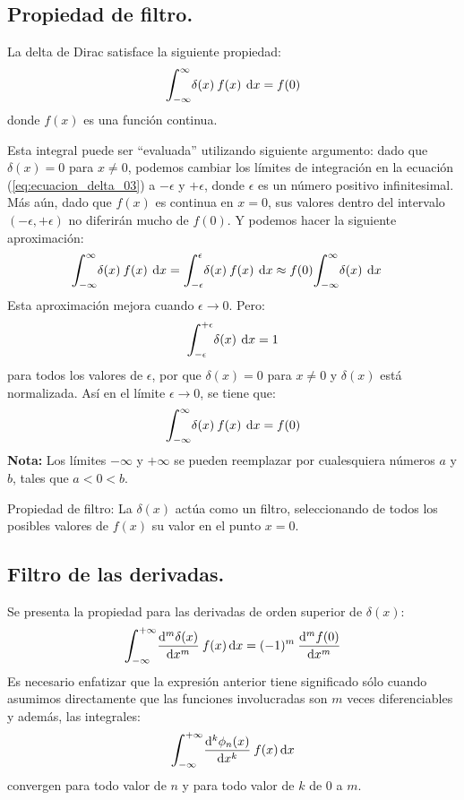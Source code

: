 \documentclass[12pt]{article}
\def\scaleint#1{\vcenter{\hbox{\scaleto[3ex]{\displaystyle\int}{#1}}}}
\def\bs{\mkern-12mu}
\numberwithin{equation}{section}
\begin{document}
\subsection{Propiedad de filtro.}

La delta de Dirac satisface la siguiente propiedad:
\begin{equation}
\scaleint{6ex}_{\bs -\infty}^{\infty} \delta (x) \: f (x) \: \dd{x} = f (0)
\label{eq:ecuacion_delta_03}
\end{equation}
donde $f(x)$ es una función continua.
\par
Esta integral puede ser \enquote{evaluada} utilizando siguiente argumento:  dado que $\delta (x) = 0$
para $x \neq 0$, podemos cambiar los límites de integración en la ecuación (\ref{eq:ecuacion_delta_03}) a $- \epsilon$ y $+ \epsilon$, donde $\epsilon$ es un número positivo infinitesimal. Más aún, dado que $f (x)$ es continua en $x = 0$, sus valores dentro del intervalo $( - \epsilon, + \epsilon)$ no diferirán mucho de $f(0)$. Y podemos hacer la siguiente aproximación:
\begin{align*}
&\scaleint{6ex}_{\bs -\infty}^{\infty} \delta (x) \: f (x) \: \dd{x} = \scaleint{6ex}_{\bs -\epsilon}^{\epsilon} \delta (x) \: f (x) \: \dd{x} \approx f(0) \scaleint{6ex}_{\bs -\infty}^{\infty} \delta (x) \: \dd{x}
\end{align*}
Esta aproximación mejora cuando $\epsilon \to 0$. Pero:
\begin{align*}
\scaleint{6ex}_{\bs -\epsilon}^{+\epsilon} \delta (x) \: \dd{x} = 1
\end{align*}
para todos los valores de $\epsilon$, por que $\delta (x) = 0$ para $x \neq 0$ y $\delta (x)$ está normalizada. Así en el límite $\epsilon \to 0$, se tiene que:
\begin{align*}
\scaleint{6ex}_{\bs -\infty}^{\infty} \delta (x) \: f (x) \: \dd{x} = f(0)
\end{align*}
\textbf{Nota: } Los límites $-\infty$ y $+\infty$ se pueden reemplazar por cualesquiera números $a$ y $b$, tales que $a < 0 < b$.
\par
Propiedad de filtro: La $\delta (x)$ actúa como un filtro, seleccionando de todos los posibles valores de $f (x)$ su valor en el punto $x = 0$.

\subsection{Filtro de las derivadas.}

Se presenta la propiedad para las derivadas de orden superior de $\delta (x)$:
\begin{align*}
\scaleint{6ex}_{\bs -\infty}^{+\infty} \dv[m]{\delta (x)}{x} \: f (x) \dd{x} =  (-1)^{m} \: \dv[m]{f (0)}{x}
\end{align*}
Es necesario enfatizar que la expresión anterior tiene significado sólo cuando asumimos directamente que las funciones involucradas son $m$ veces diferenciables y además, las integrales:
\begin{align*}
\scaleint{6ex}_{\bs -\infty}^{+\infty} \dv[k]{\phi_{n}(x)}{x} \: f (x) \dd{x}
\end{align*}
convergen para todo valor de $n$ y para todo valor de $k$ de $0$ a $m$.
\end{document}
